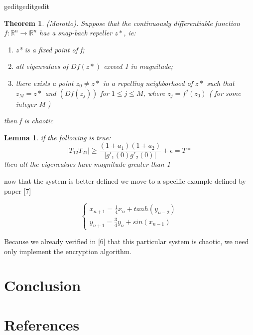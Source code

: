 geditgeditgedit\documentclass[12pt, letterpaper]{article}
\newtheorem{theorem}{Theorem}
\newtheorem{lemma}{Lemma}
\begin{document}
\begin{theorem}(Marotto). Suppose that the continuously differentiable function \(f:\mathbb{R}^{n} \rightarrow \mathbb{R}^{n}\) has a snap-back repeller \(z*\), ie:
\begin{enumerate}
    \item z* is a fixed point of f;
    \item all eigenvalues of \(Df(z*)\) exceed 1 in magnitude; 
    \item there exists a point \(z_{0} \neq z*\) in a repelling neighborhood of \(z*\) such that \(z_M = z*\) and \((Df(z_{j}))\) for \(1 \leq j \leq M\), where \(z_{j} = f^{j}(z_{0})\) ( for some integer M )\\
\end{enumerate}
then f is chaotic
\end{theorem}

\begin{lemma} if the following is true:
\[
|T_{12}T_{21}| \geq \frac{(1+a_{1})(1 + a_{2})}{|g'_{1}(0)g'_{2}(0)|} + \epsilon = T*
\]
then all the eigenvalues have magnitude greater than 1
\end{lemma}

now that the system is better defined we move to a specific example defined by paper [7]

\[
    \begin{cases}
        x_{n+1} = \frac{1}{4}x_{n} + tanh(y_{n - 2})\\
        y_{n+1} = \frac{3}{4}y_{n} + sin(x_{n - 1})
    \end{cases}
\]

Because we already verified in [6] that this particular system is chaotic, we need only implement the encryption algorithm. 

\section*{Conclusion}

\section*{References}

\fontsize{8}{12}\selectfont
\end{document}
